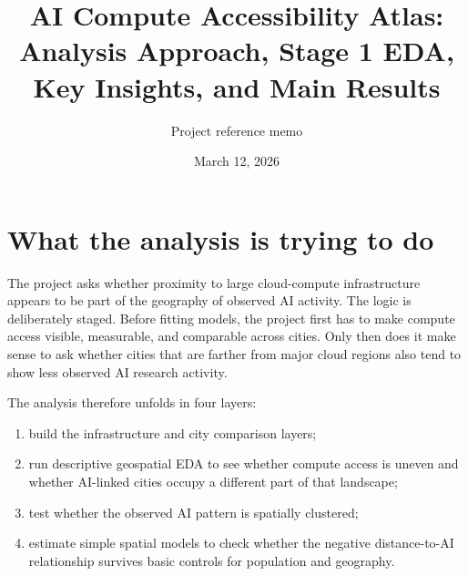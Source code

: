 \documentclass[11pt]{article}
\title{\textbf{AI Compute Accessibility Atlas:}\\
\large Analysis Approach, Stage 1 EDA, Key Insights, and Main Results}
\author{Project reference memo}
\date{March 12, 2026}
\begin{document}
\maketitle

\begin{center}
\end{center}

\section{What the analysis is trying to do}
The project asks whether proximity to large cloud-compute infrastructure appears to be part of the geography of observed AI activity. The logic is deliberately staged. Before fitting models, the project first has to make compute access visible, measurable, and comparable across cities. Only then does it make sense to ask whether cities that are farther from major cloud regions also tend to show less observed AI research activity.

The analysis therefore unfolds in four layers:
\begin{enumerate}[leftmargin=*]
    \item build the infrastructure and city comparison layers;
    \item run descriptive geospatial EDA to see whether compute access is uneven and whether AI-linked cities occupy a different part of that landscape;
    \item test whether the observed AI pattern is spatially clustered;
    \item estimate simple spatial models to check whether the negative distance-to-AI relationship survives basic controls for population and geography.
\end{enumerate}
\end{document}
